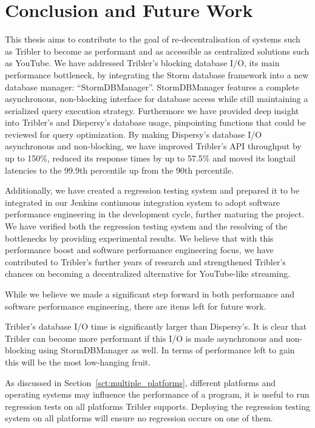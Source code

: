 \chapter{Conclusion and Future Work}
\label{cpt:conclusion_and_future_work}

This thesis aims to contribute to the goal of re-decentralisation of systems such as Tribler to become as performant and as accessible as centralized solutions such as YouTube.
We have addressed Tribler's blocking database I/O, its main performance bottleneck, by integrating the Storm database framework into a new database manager: \enquote{StormDBManager}.
StormDBManager features a complete asynchronous, non-blocking interface for database access while still maintaining a serialized query execution strategy.
Furthermore we have provided deep insight into Tribler's and Dispersy's database usage, pinpointing functions that could be reviewed for query optimization.
By making Dispersy's database I/O asynchronous and non-blocking, we have improved Tribler's API throughput by up to 150\%, reduced its response times by up to 57.5\% and moved its longtail latencies to the 99.9th percentile up from the 90th percentile.

Additionally, we have created a regression testing system and prepared it to be integrated in our Jenkins continuous integration system to adopt software performance engineering in the development cycle, further maturing the project.
We have verified both the regression testing system and the resolving of the bottlenecks by providing experimental results.
We believe that with this performance boost and software performance engineering focus, we have contributed to Tribler's further years of research and strengthened Tribler's chances on becoming a decentralized alternative for YouTube-like streaming.

While we believe we made a significant step forward in both performance and software performance engineering, there are items left for future work.

Tribler's database I/O time is significantly larger than Dispersy's.
It is clear that Tribler can become more performant if this I/O is made asynchronous and non-blocking using StormDBManager as well.
In terms of performance left to gain this will be the most low-hanging fruit.

As discussed in Section~\ref{sct:multiple_platforms}, different platforms and operating systems may influence the performance of a program, it is useful to run regression tests on all platforms Tribler supports.
Deploying the regression testing system on all platforms will ensure no regression occurs on one of them.

